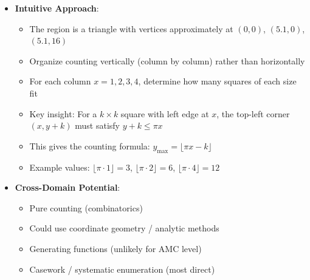 \documentclass[12pt]{article}
\begin{document}
\begin{problemconfigbox}
\begin{itemize}[leftmargin=*]
    \item \textbf{Intuitive Approach}: 
    \begin{itemize}
        \item The region is a triangle with vertices approximately at $(0,0)$, $(5.1, 0)$, $(5.1, 16)$
        \item Organize counting vertically (column by column) rather than horizontally
        \item For each column $x = 1, 2, 3, 4$, determine how many squares of each size fit
        \item Key insight: For a $k \times k$ square with left edge at $x$, the top-left corner $(x, y+k)$ must satisfy $y+k \leq \pi x$
        \item This gives the counting formula: $y_{\max} = \lfloor \pi x - k \rfloor$
        \item Example values: $\lfloor \pi \cdot 1 \rfloor = 3$, $\lfloor \pi \cdot 2 \rfloor = 6$, $\lfloor \pi \cdot 4 \rfloor = 12$
    \end{itemize}
    
    \item \textbf{Cross-Domain Potential}: 
    \begin{itemize}
        \item Pure counting (combinatorics)
        \item Could use coordinate geometry / analytic methods
        \item Generating functions (unlikely for AMC level)
        \item Casework / systematic enumeration (most direct)
    \end{itemize}
\end{itemize}
\end{problemconfigbox}
\end{document}
